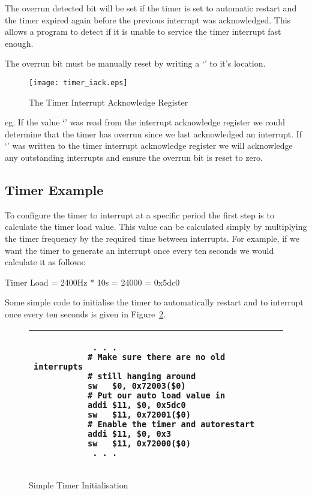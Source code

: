 The overrun detected bit will be set if the timer is set to automatic
restart and the timer expired again before the previous interrupt was
acknowledged. This allows a program to detect if it is unable to
service the timer interrupt fast enough.

The overrun bit must be manually reset by writing a `' to
it's location.

\begin{figure}[h]
\begin{center}
\texttt{[image: timer\_iack.eps]}
\caption{The Timer Interrupt Acknowledge Register}
\label{timer_iack_pic}
\end{center}
\end{figure}

eg. If the value `' was read from the interrupt acknowledge
register we could determine that the timer has overrun since we last
acknowledged an interrupt. If `' was written to the timer
interrupt acknowledge register we will acknowledge any outstanding
interrupts and ensure the overrun bit is reset to zero.

\subsection{Timer Example}

To configure the timer to interrupt at a specific period the first
step is to calculate the timer load value. This value can be
calculated simply by multiplying the timer frequency by the required
time between interrupts. For example, if we want the timer to generate
an interrupt once every ten seconds we would calculate it as follows:

\begin{center}
Timer Load = 2400Hz * 10s = 24000 = 0x5dc0
\end{center}

Some simple code to initialise the timer to automatically restart and
to interrupt once every ten seconds is given in
Figure~\ref{code:timer_init}.

\begin{figure}[h]
\begin{footnotesize}
\begin{center}
\begin{tabular}{|p{8cm}|}
\hline
\begin{verbatim}
            . . .
           # Make sure there are no old interrupts
           # still hanging around
           sw   $0, 0x72003($0)
           # Put our auto load value in
           addi $11, $0, 0x5dc0
           sw   $11, 0x72001($0)
           # Enable the timer and autorestart
           addi $11, $0, 0x3
           sw   $11, 0x72000($0)
            . . .
\end{verbatim}
\\
\hline
\end{tabular}
\end{center}
\end{footnotesize}
\caption{Simple Timer Initialisation}
\label{code:timer_init}
\end{figure}
